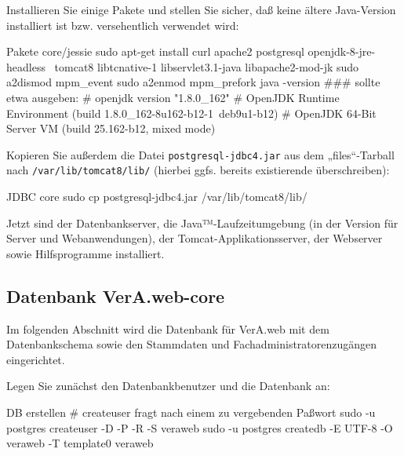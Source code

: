 \documentclass{tarentanleitung}
\begin{document}
\begin{minipage}{\linewidth}
Installieren Sie einige Pakete und stellen Sie sicher, daß keine
ältere Java-Version installiert ist bzw. versehentlich verwendet wird:

\begin{lstdump}{Pakete core/jessie}
sudo apt-get install curl apache2 postgresql openjdk-8-jre-headless \
    tomcat8 libtcnative-1 libservlet3.1-java libapache2-mod-jk
sudo a2dismod mpm_event
sudo a2enmod mpm_prefork
java -version
### sollte etwa ausgeben:
# openjdk version "1.8.0_162"
# OpenJDK Runtime Environment (build 1.8.0_162-8u162-b12-1~deb9u1-b12)
# OpenJDK 64-Bit Server VM (build 25.162-b12, mixed mode)
\end{lstdump}
\end{minipage}

\begin{minipage}{\linewidth}
Kopieren Sie außerdem die Datei \texttt{postgresql-jdbc4.jar} aus
dem „files“-Tarball nach \texttt{/var/lib/tomcat8/lib/} (hierbei
ggfs. bereits existierende überschreiben):

\begin{lstdump}{JDBC core}
sudo cp postgresql-jdbc4.jar /var/lib/tomcat8/lib/
\end{lstdump}
\end{minipage}

Jetzt sind der Datenbankserver, die Java™-Laufzeitumgebung (in der
Version für Server und Webanwendungen), der Tomcat-Applikationsserver,
der Webserver sowie Hilfsprogramme installiert.

\subsection{Datenbank VerA.web-core}\label{subsec:setup-core-db}

Im folgenden Abschnitt wird die Datenbank für VerA.web mit dem
Datenbankschema sowie den Stammdaten und Fachadministratorenzugängen
eingerichtet.

\begin{minipage}{\linewidth}
Legen Sie zunächst den Datenbankbenutzer und die Datenbank an:

\begin{lstdump}{DB erstellen}
# createuser fragt nach einem zu vergebenden Paßwort
sudo -u postgres createuser -D -P -R -S veraweb
sudo -u postgres createdb -E UTF-8 -O veraweb -T template0 veraweb
\end{lstdump}
\end{minipage}
\end{document}
